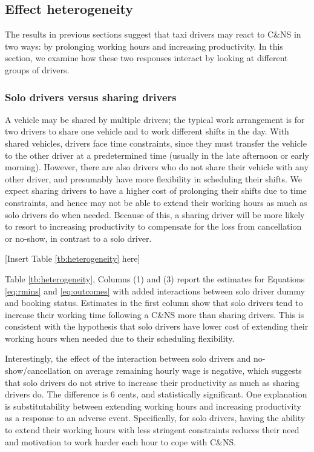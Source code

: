 \documentclass[reviewmode]{restud}
\begin{document}
\subsection{Effect heterogeneity}

The results in previous sections suggest that taxi drivers may react to C\&NS in two ways: by prolonging working hours and increasing productivity. In this section, we examine how these two responses interact by looking at different groups of drivers.

\subsubsection{Solo drivers versus sharing drivers}

A vehicle may be shared by multiple drivers; the typical work arrangement is for two drivers to share one vehicle and to work different shifts in the day. With shared vehicles, drivers face time constraints, since they must transfer the vehicle to the other driver at a predetermined time (usually in the late afternoon or early morning). However, there are also drivers who do not share their vehicle with any other driver, and presumably have more flexibility in scheduling their shifts.
We expect sharing drivers to have a higher cost of prolonging their shifts due to time constraints, and hence may not be able to extend their working hours as much as solo drivers do when needed. Because of this, a sharing driver will be more likely to resort to increasing productivity to compensate for the loss from cancellation or no-show, in contrast to a solo driver.

\begin{center}
	[Insert Table \ref{tb:heterogeneity} here]
\end{center}

Table \ref{tb:heterogeneity}, Columns (1) and (3) report the estimates for Equations \eqref{eq:rmins} and \eqref{eq:outcomes} with added interactions between solo driver dummy and booking status. Estimates in the first column show that solo drivers tend to increase their working time following a C\&NS more than sharing drivers. This is consistent with the hypothesis that solo drivers have lower cost of extending their working hours when needed due to their scheduling flexibility.

Interestingly, the effect of the interaction between solo drivers and no-show/cancellation on average remaining hourly wage is negative, which suggests that solo drivers do not strive to increase their productivity as much as sharing drivers do. The difference is 6 cents, and statistically significant. One explanation is substitutability between extending working hours and increasing productivity as a response to an adverse event. Specifically, for solo drivers, having the ability to extend their working hours with less stringent constraints reduces their need and motivation to work harder each hour to cope with C\&NS.
\end{document}
